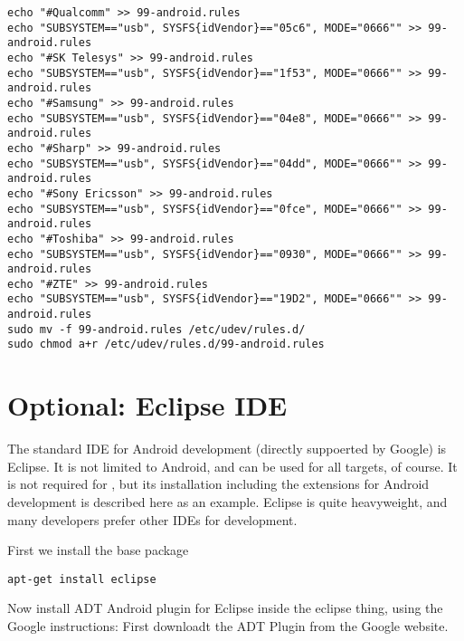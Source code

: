 \begin{maxipage}
\begin{verbatim}
echo "#Qualcomm" >> 99-android.rules
echo "SUBSYSTEM=="usb", SYSFS{idVendor}=="05c6", MODE="0666"" >> 99-android.rules
echo "#SK Telesys" >> 99-android.rules
echo "SUBSYSTEM=="usb", SYSFS{idVendor}=="1f53", MODE="0666"" >> 99-android.rules
echo "#Samsung" >> 99-android.rules
echo "SUBSYSTEM=="usb", SYSFS{idVendor}=="04e8", MODE="0666"" >> 99-android.rules
echo "#Sharp" >> 99-android.rules
echo "SUBSYSTEM=="usb", SYSFS{idVendor}=="04dd", MODE="0666"" >> 99-android.rules
echo "#Sony Ericsson" >> 99-android.rules
echo "SUBSYSTEM=="usb", SYSFS{idVendor}=="0fce", MODE="0666"" >> 99-android.rules
echo "#Toshiba" >> 99-android.rules
echo "SUBSYSTEM=="usb", SYSFS{idVendor}=="0930", MODE="0666"" >> 99-android.rules
echo "#ZTE" >> 99-android.rules
echo "SUBSYSTEM=="usb", SYSFS{idVendor}=="19D2", MODE="0666"" >> 99-android.rules
sudo mv -f 99-android.rules /etc/udev/rules.d/
sudo chmod a+r /etc/udev/rules.d/99-android.rules
\end{verbatim}
\end{maxipage}

\section{Optional: Eclipse IDE}
The standard IDE for Android development (directly suppoerted by Google) is Eclipse. It is not limited to Android, and can be used for all targets, of course. It is not required for \xc, but its installation including the extensions for Android development is described here as an example. Eclipse is quite heavyweight, and many developers prefer other IDEs for \xc development.

First we install the base package

\begin{verbatim}
apt-get install eclipse
\end{verbatim}

Now install ADT Android plugin for Eclipse inside the eclipse thing, using the Google instructions:
First downloadt the ADT Plugin from the Google website.

